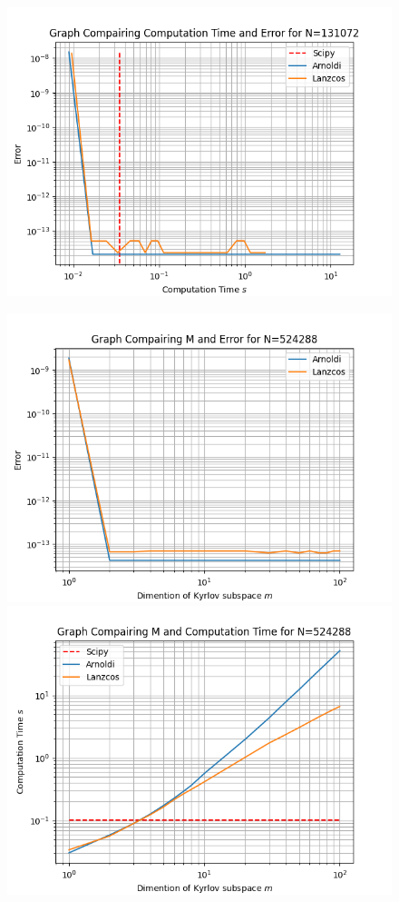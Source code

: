 \documentclass{article}
\begin{document}
\begin{figure}[H]
\begin{minipage}{0.5\textwidth}
	  \label{fig:MEe7}
       \centering
	  \includegraphics[width=\linewidth]{Plots/Comp Time v E Results for N=131072.png}
	  \label{fig:MEe7}
    \end{minipage}\hfill
    \begin{minipage}{0.5\textwidth}
       \centering
	  \includegraphics[width=\linewidth]{Plots/M v E Results for N=524288.png}
	  \label{fig:MEe6}
       \centering
	  \includegraphics[width=\linewidth]{Plots/M v Comp Time Results for N=524288.png}

\end{minipage}
\end{figure}
\end{document}
